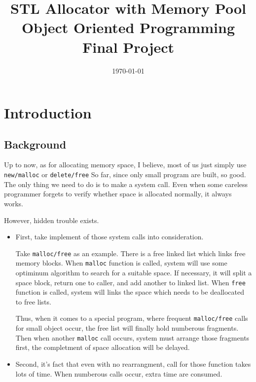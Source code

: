 \documentclass{article}
\begin{document}
\setsansfont{Verdana}
\setmonofont{Courier}
\SetAlFnt{\ttfamily}


\renewcommand{\figurename}{\textbf{Diagram}}

\fancyhf{}
\cfoot{\thepage}

\renewcommand\contentsname{Content}
\renewcommand{\lstlistingname}{\textbf{Code}}

\title{\textbf{STL Allocator with Memory Pool} \\
	\large Object Oriented Programming\\
	\large Final Project}
\date{\today}

\maketitle
\thispagestyle{empty}
\newpage
\pagestyle{plain}

\tableofcontents
\thispagestyle{empty}
\newpage
\setcounter{page}{1}
\pagestyle{fancy}

\section{Introduction}
\subsection{Background}
Up to now, as for allocating memory space, I believe, most of us just simply use \texttt{new/malloc} or \texttt{delete/free} So far, since only small program are built, so good. The only thing we need to do is to make a system call. Even when some careless programmer forgets to verify whether space is allocated normally, it always works. 

However, hidden trouble exists. 
\begin{itemize}
	\item First, take implement of those system calls into consideration. 
	
	Take \texttt{malloc/free} as an example. There is a free linked list which links free memory blocks. When \texttt{malloc} function is called, system will use some optiminum algorithm to search for a suitable space. If necessary, it will split a space block, return one to caller, and add another to linked list. When \texttt{free} function is called, system will links the space which needs to be deallocated to free lists. 
	
	Thus, when it comes to a special program, where frequent \texttt{malloc/free} calls for small object occur, the free list will finally hold numberous fragments. Then when another \texttt{malloc} call occurs, system must arrange those fragments first, the completment of space allocation will be delayed. 
	
	\item Second, it's fact that even with no rearrangment, call for those function takes lots of time. When numberous calls occur, extra time are consumed.
\end{itemize}
\end{document}
